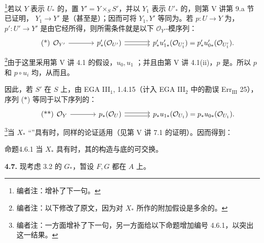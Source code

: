 \footnote{编者注：增补了下一句。}若以 $Y$ 表示 $U_*$ 的，置 $Y'=Y\times_S S'$，并以 $Y_1$ 表示 $U'_*$ 的，则第 V 讲第 9.a 节已证明， $Y_1\to Y'$ 是（甚至是）；因而可将 $Y_1,Y'$ 等同为。若 $p:U\to Y$ 为，$p':U'\to Y'$ 是由它经所得，则所需条件就是以下 $\mathcal O_{Y'}$-模序列：
\[
\tag{*}
\begin{tikzcd}[column sep=large]
\mathcal O_{Y'}\arrow[r]&p'_*(\mathcal O_{U'})\arrow[r,shift left=.5ex]\arrow[r,shift right=.5ex]&p'_*u'_{1*}(\mathcal O_{U'_1})=p'_*u'_{0*}(\mathcal O_{U'_1}).
\end{tikzcd}
\]
\footnote{编者注：以下修改了原文，因为对 $X_*$ 所作的附加假设是多余的。}由于这里采用第 V 讲 4.1 的假设，$u_0,u_1$ ；并且由第 V 讲 4.1(ii)，$p$ 是。所以 $p$ 和 $p\circ u_i$ 均，从而且。

因此，若 $S'$ 在 $S$ 上，由 EGA III$_1$, 1.4.15（计入 EGA III$_2$ 中的勘误 Err$_{\mathrm{III}}$ 25），序列 ($*$) 等同于以下序列的：
\[
\tag{**}
\begin{tikzcd}[column sep=large]
\mathcal O_Y\arrow[r]&p_*(\mathcal O_U)\arrow[r,shift left=.5ex]\arrow[r,shift right=.5ex]&p_*u_{1*}(\mathcal O_{U_1})=p_*u_{0*}(\mathcal O_{U_1}).
\end{tikzcd}
\]
\footnote{编者注：一方面增补了下一句，另一方面给以下命题增加编号 4.6.1，以突出这一结果。}当 $X_*$ “”具有时，同样的论证适用（见第 V 讲 7.1 的证明）。因而得到：
\begin{SGAresult}{命题}{4.6.1}
当 $X_*$ 具有时，其的构造与底的可交换。
\end{SGAresult}
\textbf{4.7.} 现考虑 3.2 的 $G_*$，暂设 $F,G$ 都在 $A$ 上。

